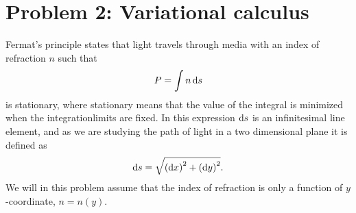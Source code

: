 \documentclass[12pt,twoside]{article}
\begin{document}
\section*{Problem 2: Variational calculus}
Fermat's principle states that light travels through media with an index of refraction $n$ such that
\begin{equation}
  P = \int n \dif s
\end{equation}
is stationary, where stationary means that the value of the integral is minimized when the integrationlimits are fixed. In this expression $\dif s$ is an infinitesimal line element, and as we are studying the path of light in a two dimensional plane it is defined as
\begin{equation}
  \dif s = \sqrt{\left(\dif x\right)^2 + \left(\dif y\right)^2}. \label{s}
\end{equation}
We will in this problem assume that the index of refraction is only a function of $y$-coordinate, $n=n(y)$.
\end{document}

